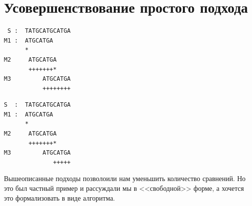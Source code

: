 \documentclass[letterpaper, 11pt]{article}
\begin{document}
\section{Усовершенствование простого подхода}
\par
\begin{verbatim}
 S :  TATGCATGCATGA
M1 :  ATGCATGA
      * 
M2     ATGCATGA
       +++++++*
M3         ATGCATGA
           ++++++++
\end{verbatim}

\par
\begin{verbatim}
S  :  TATGCATGCATGA
M1 :  ATGCATGA
      * 
M2     ATGCATGA
       +++++++*
M3         ATGCATGA
              +++++
\end{verbatim}
\par
Вышеописанные подходы позволоили нам уменьшить количество сравнений. Но это был частный пример и рассуждали мы в <<свободной>> форме, а хочется это формализовать в виде алгоритма.
\end{document}
